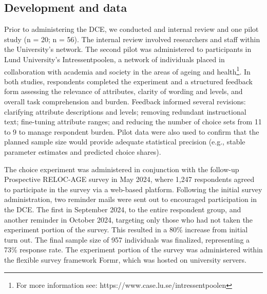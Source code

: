 \documentclass[3p,11pt ]{elsarticle}
\begin{document}
%
%
%
%
%





\subsection{Development and data}

Prior to administering the DCE, we conducted and internal review and one pilot study (n = 20; n = 56).
The internal review involved researchers and staff within the University’s network.
The second pilot was administered to participants in Lund University’s Intressentpoolen,
a network of individuals placed in collaboration with academia and society in the areas of ageing and health\footnote{ For more information see: https://www.case.lu.se/intressentpoolen}.
In both studies, respondents completed the experiment and a structured feedback form assessing the relevance of attributes, clarity of wording and levels, and overall task comprehension and burden.
Feedback informed several revisions: clarifying attribute descriptions and levels; removing redundant instructional text; fine-tuning attribute ranges; and reducing the number of choice sets from 11 to 9 to manage respondent burden. Pilot data were also used to confirm that the planned sample size would provide adequate statistical precision (e.g., stable parameter estimates and predicted choice shares).

The choice experiment was administered in conjunction with the follow-up Prospective RELOC-AGE survey in May 2024,
where 1,247 respondents agreed to participate in the survey via a web-based platform.
Following the initial survey administration, 
two reminder mails were sent out to encouraged participation in the DCE.
The first in September 2024,
to the entire respondent group,
and another reminder in October 2024,
targeting only those who had not taken the experiment portion of the survey.
This resulted in a 80\% increase from initial turn out.
The final sample size of 957 individuals was finalized, representing a 73\% response rate.
The experiment portion of the survey was administered within the flexible survey framework Formr,
which was hosted on university servers.
\end{document}
